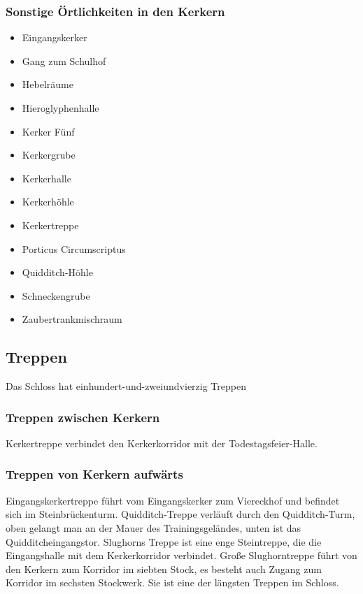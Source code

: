 \documentclass[a4paper, 10pt]{article}
\begin{document}
\subsubsection*{\large Sonstige Örtlichkeiten in den Kerkern}
\vspace{10pt}
\begin{itemize}
    \item Eingangskerker
    \item Gang zum Schulhof
    \item Hebelräume
    \item Hieroglyphenhalle
    \item Kerker Fünf
    \item Kerkergrube
    \item Kerkerhalle
    \item Kerkerhöhle
    \item Kerkertreppe
    \item Porticus Circumscriptus
    \item Quidditch-Höhle
    \item Schneckengrube
    \item Zaubertrankmischraum
\end{itemize}

\subsection*{\Large Treppen}
Das Schloss hat einhundert-und-zweiundvierzig Treppen
\subsubsection*{\large Treppen zwischen Kerkern}
Kerkertreppe verbindet den Kerkerkorridor mit der Todestagsfeier-Halle.
\subsubsection*{\large Treppen von Kerkern aufwärts}
Eingangskerkertreppe führt vom Eingangskerker zum Viereckhof und befindet sich im Steinbrückenturm.
Quidditch-Treppe verläuft durch den Quidditch-Turm, oben gelangt man an der Mauer des Trainingsgeländes, unten ist das Quidditcheingangstor.
\vspace{10pt}
\newline
{}  
Slughorns Treppe ist eine enge Steintreppe, die die Eingangshalle mit dem Kerkerkorridor verbindet.
\vspace{10pt}
\newline
{}  
Große Slughorntreppe führt von den Kerkern zum Korridor im siebten Stock, es besteht auch Zugang zum Korridor im sechsten Stockwerk. Sie ist eine der längsten Treppen im Schloss.
\end{document}
